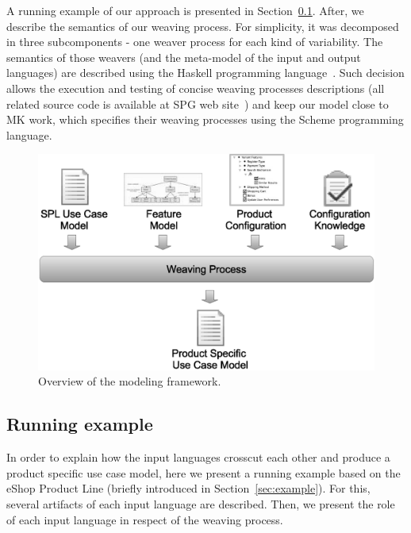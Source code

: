 \documentclass{acm_proc_article-sp}
\begin{document}
A running example of our approach is presented in Section~\ref{sub:running}. After, we describe the semantics of our weaving process. For 
simplicity, it was decomposed in three subcomponents - one weaver process for each kind of variability.  The semantics of those 
weavers (and the meta-model of the input and output languages) are described using the Haskell programming language~\cite{haskell-report}. 
Such decision allows the execution and testing of concise weaving processes descriptions (all related source code is available at SPG web site~\cite{spg-url}) and keep our model close to MK work, which specifies their weaving processes using the Scheme programming language.


\begin{figure}[h]
 \begin{center}
  \includegraphics[scale=0.30]{img/weave-process2.eps}
  \caption{Overview of the modeling framework.}
  \label{fig:weave-process}
  \end{center}
\end{figure}

\subsection{Running example}
\label{sub:running}

In order to explain how the input languages crosscut each other and produce a product specific use case model, here we present a 
running example based on the eShop Product Line (briefly introduced in Section~\ref{sec:example}). For this, several artifacts of each 
input language are described. Then, we present the role of each input language in respect of the weaving process.
\end{document}
